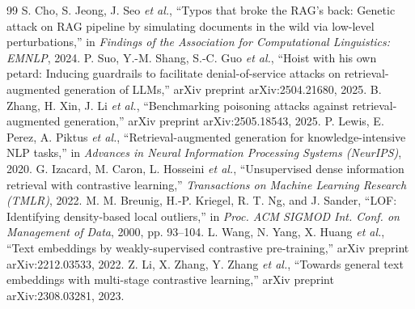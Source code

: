 \documentclass[10pt,journal,compsoc]{IEEEtran}
\begin{document}
\begin{thebibliography}{99}
 S. Cho, S. Jeong, J. Seo \emph{et al.}, ``Typos that broke the RAG's back: Genetic attack on RAG pipeline by simulating documents in the wild via low-level perturbations,'' in \emph{Findings of the Association for Computational Linguistics: EMNLP}, 2024.
 P. Suo, Y.-M. Shang, S.-C. Guo \emph{et al.}, ``Hoist with his own petard: Inducing guardrails to facilitate denial-of-service attacks on retrieval-augmented generation of LLMs,'' arXiv preprint arXiv:2504.21680, 2025.
 B. Zhang, H. Xin, J. Li \emph{et al.}, ``Benchmarking poisoning attacks against retrieval-augmented generation,'' arXiv preprint arXiv:2505.18543, 2025.
 P. Lewis, E. Perez, A. Piktus \emph{et al.}, ``Retrieval-augmented generation for knowledge-intensive NLP tasks,'' in \emph{Advances in Neural Information Processing Systems (NeurIPS)}, 2020.
 G. Izacard, M. Caron, L. Hosseini \emph{et al.}, ``Unsupervised dense information retrieval with contrastive learning,'' \emph{Transactions on Machine Learning Research (TMLR)}, 2022.
 M. M. Breunig, H.-P. Kriegel, R. T. Ng, and J. Sander, ``LOF: Identifying density-based local outliers,'' in \emph{Proc. ACM SIGMOD Int. Conf. on Management of Data}, 2000, pp. 93--104.
 L. Wang, N. Yang, X. Huang \emph{et al.}, ``Text embeddings by weakly-supervised contrastive pre-training,'' arXiv preprint arXiv:2212.03533, 2022.
 Z. Li, X. Zhang, Y. Zhang \emph{et al.}, ``Towards general text embeddings with multi-stage contrastive learning,'' arXiv preprint arXiv:2308.03281, 2023.
\end{thebibliography}
\end{document}
